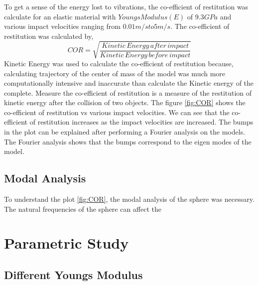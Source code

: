 To get a sense of the energy lost to vibrations, the co-efficient of restitution was calculate for an elastic material with $Youngs Modulus(E)$ of $9.3GPa$ and various impact velocities ranging from $0.01m/s to 5m/s$.
The co-efficient of restitution was calculated by,
\begin{equation}
COR = \sqrt{\frac{Kinetic\, Energy\, after\, impact}{Kinetic\, Energy\, before\, impact}}
\end{equation}
Kinetic Energy was used to calculate the co-efficient of restitution because, calculating trajectory of the center of mass of the model was much more computationally intensive and inaccurate than calculate the Kinetic energy of the complete.
Measure the co-efficient of restitution is a measure of the restitution of kinetic energy after the collision of two objects. The figure \ref{fig:COR} shows the co-efficient of restitution vs various impact velocities. We can see that the co-efficient of restitution increases as the impact velocities are increased. The bumps in the plot can be explained after performing a Fourier analysis on the models. The Fourier analysis shows that the bumps correspond to the eigen modes of the model.

\subsection{Modal Analysis}

To understand the plot \ref{fig:COR}, the modal analysis of the sphere was necessary. The natural frequencies of the sphere can affect the 

\section{Parametric Study}





\subsection{Different Youngs Modulus}

\begin{figure}[H]
\end{figure}


